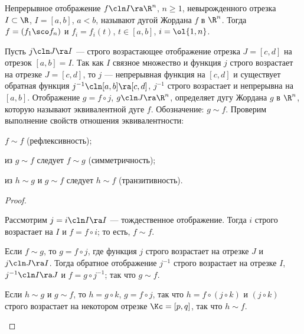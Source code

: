 \documentclass[a4paper]{article}
\begin{document}
\subsubsection{}

Непрерывное отображение $f\cln I\ra\R^n$, $n\ge1$, невырожденного
отрезка $I\subset\R$, $I=[a,b]$, $a<b$, называют дугой Жордана $f$ в
$\R^n$. Тогда $f=(f_1\sco f_n)$ и $f_i=f_i(t)$, $t\in[a,b]$,
$i=\ol{1,n}$.

Пусть $j\cln J\ra I$ --- строго возрастающее отображение отрезка
$J=[c,d]$ на отрезок $[a,b]=I$. Так как $I$ связное множество и
функция $j$ строго возрастает на отрезке $J=[c,d]$, то $j$ ---
непрерывная функция на $[c,d]$ и существует обратная функция
$j^{-1}\cln [a,b]\ra[c,d]$, $j^{-1}$ строго возрастает и непрерывна
на $[a,b]$. Отображение $g=f\circ j$, $g\cln J\ra\R^n$, определяет
дугу Жордана $g$ в $\R^n$, которую называют эквивалентной дуге $f$.
Обозначение: $g\sim f$. Проверим выполнение свойств отношения
эквивалентности:

\begin{nums}{-2}
\item $f\sim f$ (рефлексивность);

\item из $g\sim f$ следует $f\sim g$ (симметричность);

\item из $h\sim g$ и $g\sim f$ следует $h\sim f$ (транзитивность).
\end{nums}

\begin{proof}
\begin{nums}{-2}

\item Рассмотрим $j=i\cln I\ra I$ --- тождественное отображение.
Тогда $i$ строго возрастает на $I$ и $f=f\circ i$; то есть, $f\sim
f$.

\item Если $f\sim g$, то $g=f\circ j$, где функция $j$ строго
возрастает на отрезке $J$ и $j\cln J\ra I$. Тогда обратное
отображение $j^{-1}$ строго возрастает на отрезке $I$, $j^{-1}\cln
I\ra J$ и $f=g\circ j^{-1}$; так что $g\sim f$.

\item Если $h\sim g$ и $g\sim f$, то $h=g\circ k$, $g=f\circ j$, так
что $h=f\circ (j\circ k)$ и $(j\circ k)$ строго возрастает на
некотором отрезке $\Kc=[p,q]$, так что $h\sim f$.
\end{nums}
\end{proof}
\end{document}
